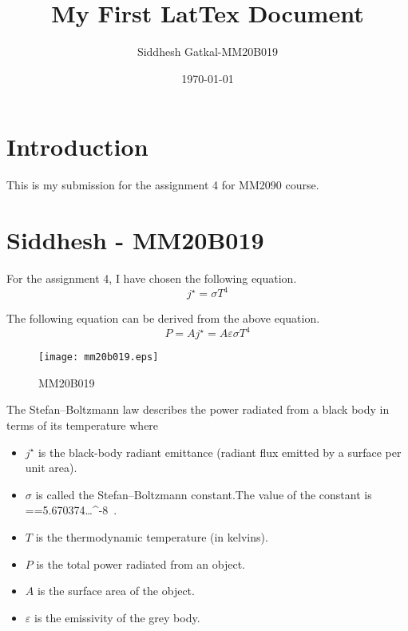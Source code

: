 \documentclass[a4paper, 12pt]{article}
\begin{document}
\title{My First LatTex Document}
\author{Siddhesh Gatkal-MM20B019}
\date{\today}
\maketitle

\tableofcontents

\section{Introduction}

This is my submission for the assignment 4 for MM2090 course.

\section{Siddhesh - MM20B019}
For the assignment 4, I have chosen the following equation.
\begin{equation}
	 j^{\star} = \sigma T^{4}
	\label{eqn:stefboltz}
\end{equation}

The following equation can be derived from the above equation.
\begin{equation}
     P= A j^{\star} = A \varepsilon\sigma T^{4}
	\label{eqn2:stefboltz}
\end{equation}

\begin{figure}[h]
	\begin{center}
		\texttt{[image: mm20b019.eps]}
	\end{center}
	\caption{MM20B019}
	\label{graph}
\end{figure}

The Stefan–Boltzmann law describes the power radiated from a black body in terms of its temperature where

\begin{itemize}
	\item $j^{\star}$ is the black-body radiant emittance (radiant flux emitted by a surface per unit area).
	\item $\sigma$ is called the Stefan–Boltzmann constant.The value of the constant is {\displaystyle \sigma ={}=5.670374\ldots {}^{-8}\, .}
	
	\item $T$ is the thermodynamic temperature (in kelvins).
	\item $P$ is the total power radiated from an object.
	\item $A$ is the surface area of the object.
	\item $\varepsilon$ is the emissivity of the grey body.

\end{itemize}
\end{document}
